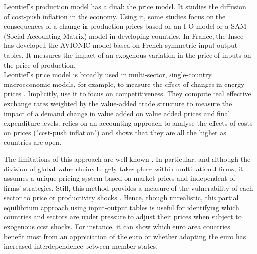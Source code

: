 \documentclass[11pt,a4paper]{article}
\begin{document}
Leontief's production model has a dual: the price model.
It studies the diffusion of cost-push inflation in the economy.
Using it, some studies focus on the consequences of a change in production prices based on an I-O model or a SAM (Social Accounting Matrix) model in developing countries.
In France, the Insee \citep{Bourgeois2019} has developed the AVIONIC model based on French symmetric input-output tables. 
It measures the impact of an exogenous variation in the price of inputs on the price of production. \\
Leontief's price model is broadly used in multi-sector, single-country macroeconomic models, for example, to measure the effect of changes in energy prices \citep{Bournay2015, Sharify2013}. Implicitly, \cite{Bems2015} use it to focus on competitiveness. 
They compute real effective exchange rates weighted by the value-added trade structure to measure the impact of a demand change in value added on value added prices and final expenditure levels. %
\cite{Cochard2016} relies on an accounting approach to analyse the effects of costs on prices ("cost-push inflation") and shows that they are all the higher as countries are open.

The limitations of this approach are well known \citep{Folloni1994}. In particular, and although the division of global value chains largely takes place within multinational firms, it assumes a unique pricing system based on market prices and independent of firms' strategies. Still, this method provides a measure of the vulnerability of each sector to price or productivity shocks \citep{Acemoglu2012,Carvalho2014}. 
Hence, though unrealistic, this partial equilibrium approach using input-output tables is useful for identifying which countries and sectors are under pressure to adjust their prices when subject to exogenous cost shocks. For instance, it can show which euro area countries benefit most from an appreciation of the euro or whether adopting the euro has increased interdependence between member states.
\end{document}
